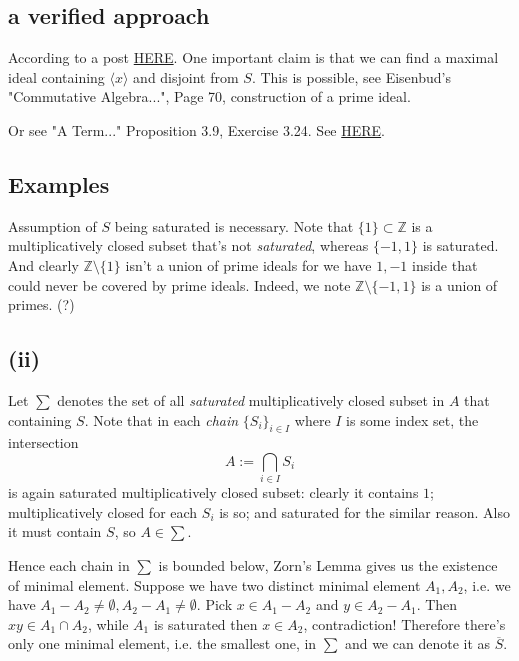 \subsection{a verified approach}

According to a post \href{https://math.stackexchange.com/questions/57684/complement-of-saturated-set}{HERE}. One important claim is that we can find a maximal ideal containing $\langle x\rangle$ and disjoint from $S$. This is possible, see Eisenbud's "Commutative Algebra...", Page 70, construction of a prime ideal.

Or see "A Term..." Proposition 3.9, Exercise 3.24. See \href{https://math.stackexchange.com/questions/4329999/saturated-set-and-union-of-prime-ideals}{HERE}. 

\subsection{Examples}

Assumption of $S$ being saturated is necessary. Note that $\{1\}\subset \mathbb Z$ is a multiplicatively closed subset that's not \textit{saturated}, whereas $\{-1,1\}$ is saturated. And clearly $\mathbb Z\setminus \{1\}$ isn't a union of prime ideals for we have $1,-1$ inside that could never be covered by prime ideals. Indeed, we note $\mathbb Z\setminus \{-1,1\}$ is a union of primes. (?) 

\subsection{(ii)}

Let $\sum$ denotes the set of all \textit{saturated} multiplicatively closed subset in $A$ that containing $S$. Note that in each \textit{chain} $\{S_i\}_{i\in I}$ where $I$ is some index set, the intersection 
$$A:=\bigcap_{i\in I} S_i$$ is again saturated multiplicatively closed subset: clearly it contains $1$; multiplicatively closed for each $S_i$ is so; and saturated for the similar reason. Also it must contain $S$, so $A\in\sum$.

Hence each chain in $\sum$ is bounded below, Zorn's Lemma gives us the existence of minimal element. 
Suppose we have two distinct minimal element $A_1,A_2$, i.e. we have $A_1-A_2\neq\emptyset,A_2-A_1\neq\emptyset$. Pick $x\in A_1-A_2$ and $y\in A_2-A_1$. Then $xy\in A_1\cap A_2$, while $A_1$ is saturated then $x\in A_2$, contradiction! Therefore there's only one minimal element, i.e. the smallest one, in $\sum$ and we can denote it as $\overline{S}$.

